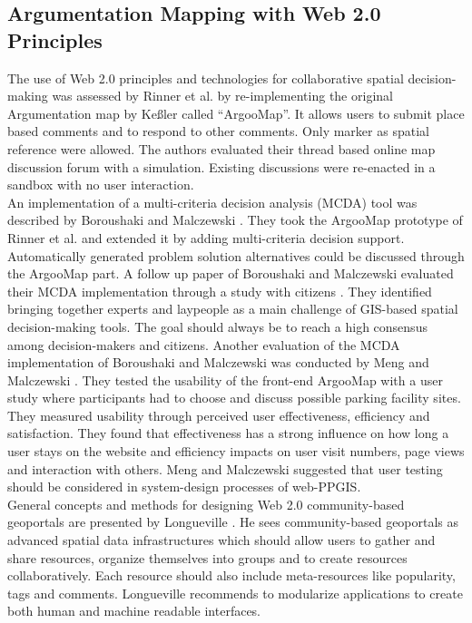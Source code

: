 \subsection{Argumentation Mapping with Web 2.0 Principles}
\label{zweifuenf}
The use of Web 2.0 principles and technologies for collaborative spatial decision-making was assessed by Rinner \cite{Rinner2009_Web2_argumap} et al. by re-implementing the original Argumentation map by Ke{\ss}ler \cite{Kessler2005_ArgumentationMapPrototype} called ``ArgooMap''. It allows users to submit place based comments and to respond to other comments. Only marker as spatial reference were allowed. The authors evaluated their thread based online map discussion forum with a simulation. Existing discussions were re-enacted in a sandbox with no user interaction.\\
An implementation of a multi-criteria decision analysis (MCDA) tool was described by Boroushaki and Malczewski \cite{Boroushaki2010_ParticipatoryGIS}. They took the ArgooMap prototype of Rinner et al. \cite{Rinner2009_Web2_argumap} and extended it by adding multi-criteria decision support. Automatically generated problem solution alternatives could be discussed through the ArgooMap part. A follow up paper of Boroushaki and Malczewski evaluated their MCDA implementation through a study with citizens \cite{Boroushaki2010_Consensus_measurement}. They identified bringing together experts and laypeople as a main challenge of GIS-based spatial decision-making tools. The goal should always be to reach a high consensus among decision-makers and citizens. Another evaluation of the MCDA implementation of Boroushaki and Malczewski was conducted by Meng and Malczewski \cite{Meng2010_ArgooMap_evaluation}. They tested the usability of the front-end ArgooMap with a user study where participants had to choose and discuss possible parking facility sites. They measured usability through perceived user effectiveness, efficiency and satisfaction. They found that effectiveness has a strong influence on how long a user stays on the website and efficiency impacts on user visit numbers, page views and interaction with others. Meng and Malczewski suggested that user testing should be considered in system-design processes of web-PPGIS. \\
General concepts and methods for designing Web 2.0 community-based geoportals are presented by Longueville \cite{Longueville2010_community_based_geoportals_web20}. He sees community-based geoportals as advanced spatial data infrastructures which should allow users to gather and share resources, organize themselves into groups and to create resources collaboratively. Each resource should also include meta-resources like popularity, tags and comments. Longueville recommends to modularize applications to create both human and machine readable interfaces.\\
